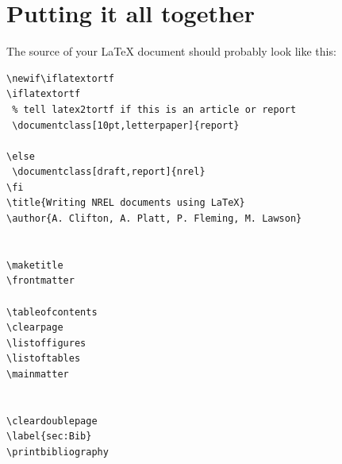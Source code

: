 \section{Putting it all together}
The source of your LaTeX document should probably look like this:

\begin{verbatim}
\newif\iflatextortf
\iflatextortf
 % tell latex2tortf if this is an article or report
 \documentclass[10pt,letterpaper]{report}
 
\else
 \documentclass[draft,report]{nrel} 
\fi
\title{Writing NREL documents using LaTeX}
\author{A. Clifton, A. Platt, P. Fleming, M. Lawson}


\maketitle
\frontmatter

\tableofcontents
\clearpage
\listoffigures
\listoftables
\mainmatter


\cleardoublepage
\label{sec:Bib}
\printbibliography


\end{verbatim}

